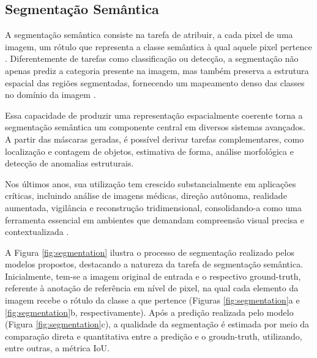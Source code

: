 



\subsection{Segmentação Semântica}

A segmentação semântica consiste na tarefa de atribuir, a cada pixel de uma imagem, um rótulo que representa a classe semântica à qual aquele pixel pertence \cite{casanova2020reinforced}. Diferentemente de tarefas como classificação ou detecção, a segmentação não apenas prediz a categoria presente na imagem, mas também preserva a estrutura espacial das regiões segmentadas, fornecendo um mapeamento denso das classes no domínio da imagem \cite{cheng2023survey_segmentation}.

Essa capacidade de produzir uma representação espacialmente coerente torna a segmentação semântica um componente central em diversos sistemas avançados. A partir das máscaras geradas, é possível derivar tarefas complementares, como localização e contagem de objetos, estimativa de forma, análise morfológica e detecção de anomalias estruturais.

Nos últimos anos, sua utilização tem crescido substancialmente em aplicações críticas, incluindo análise de imagens médicas, direção autônoma, realidade aumentada, vigilância e reconstrução tridimensional, consolidando-a como uma ferramenta essencial em ambientes que demandam compreensão visual precisa e contextualizada \cite{cheng2023survey_segmentation}.

A Figura \ref{fig:segmentation} ilustra o processo de segmentação realizado pelos modelos propostos, destacando a natureza da tarefa de segmentação semântica. Inicialmente, tem-se a imagem original de entrada e o respectivo ground-truth, referente à anotação de referência em nível de pixel, na qual cada elemento da imagem recebe o rótulo da classe a que pertence (Figuras \ref{fig:segmentation}a e \ref{fig:segmentation}b, respectivamente). Após a predição realizada pelo modelo (Figura \ref{fig:segmentation}c), a qualidade da segmentação é estimada por meio da comparação direta e quantitativa entre a predição e o groudn-truth, utilizando, entre outras, a métrica \ac{IoU}.

